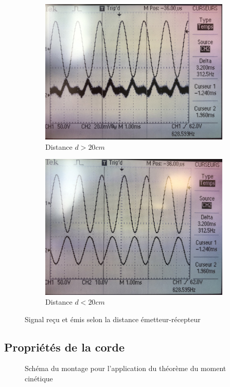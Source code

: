 \documentclass[12pt]{article}
\begin{document}
\begin{figure}[h!]
    \centering
    \begin{subfigure}{.5\textwidth}
      \centering
        \includegraphics[width=.7\linewidth]{img/son_complexe.png}
      \caption{Distance $d>20cm$}
    \end{subfigure}%
    \begin{subfigure}{.5\textwidth}
      \centering
      \includegraphics[width=.7\linewidth]{img/son_simple.png}
      \caption{Distance $d<20cm$}
    \end{subfigure}
    \caption*{Signal reçu et émis selon la distance émetteur-récepteur}
\end{figure}

\subsection{Propriétés de la corde}

\begin{figure}[!h]
    \begin{center}
        \resizebox{0.5\textwidth}{3cm}{
            
        }
    \end{center}
    \caption{Schéma du montage pour l'application du théorème du moment cinétique}
    \label{fig:montage_simple}
\end{figure}
\end{document}
